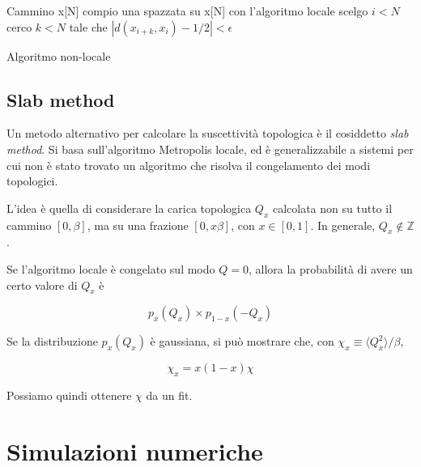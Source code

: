 \documentclass[a4paper,11pt]{article}
\newcommand{\avg}[1]{\langle {#1} \rangle}
\begin{document}
    \begin{algorithm}[H]
    Cammino x[N]\;
    compio una spazzata su x[N] con l'algoritmo locale\;
    scelgo $i < N$\;
    cerco $k < N$ tale che $| d(x_{i+k}, x_i) - 1/2| < \epsilon$\;
    \caption{Algoritmo non-locale}
    \label{alg:tailor}
    \end{algorithm}
    
    \subsection{Slab method}
    
    Un metodo alternativo per calcolare la suscettività topologica è il cosiddetto \emph{slab method}. Si basa sull'algoritmo Metropolis locale, ed è generalizzabile a sistemi per cui non è stato trovato un algoritmo che risolva il congelamento dei modi topologici.
    
    L'idea è quella di considerare la carica topologica $Q_x$ calcolata non su tutto il cammino $[0, \beta]$, ma su una frazione $[0, x\beta]$, con $x \in [0,1]$. In generale, $Q_x \not\in \mathbb{Z}$ .
    
    Se l'algoritmo locale è congelato sul modo $Q = 0$, allora la probabilità di avere un certo valore di $Q_x$ è
    
    \begin{equation}
        p_x (Q_x) \times p_{1-x} (- Q_x) 
    \end{equation}

    Se la distribuzione $p_x (Q_x)$ è gaussiana, si può mostrare che, con $\chi_x \equiv \avg{Q_x^2}/\beta$, 
    
    \begin{equation}
        \chi_x = x(1-x) \chi
    \end{equation}

    
    Possiamo quindi ottenere $\chi$ da un fit.
    
    \section{Simulazioni numeriche}
    
\end{document}
